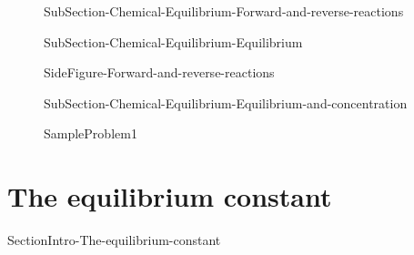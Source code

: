 \documentclass[main.tex]{subfiles}
\newcommand\chapterlabel{Ch-equilibrium}\setcounter{figurenewcounter}{0}\setcounter{tablenewcounter}{0}\setcounter{formulanewcounter}{0}
\begin{document}
\sloppy\begin{description}

\item[] {SubSection-Chemical-Equilibrium-Forward-and-reverse-reactions}




\item[] {SubSection-Chemical-Equilibrium-Equilibrium}




{SideFigure-Forward-and-reverse-reactions}




\item[] {SubSection-Chemical-Equilibrium-Equilibrium-and-concentration}



  {SampleProblem1}






\end{description}

 
\section{{The equilibrium constant}}   {SectionIntro-The-equilibrium-constant}
\end{document}

